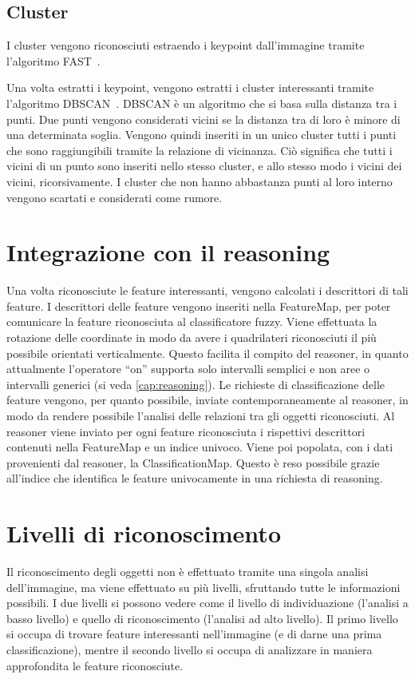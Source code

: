 \subsection{Cluster}

I cluster vengono riconosciuti estraendo i keypoint dall'immagine tramite l'algoritmo FAST~\cite{rosten_2006_machine}.


Una volta estratti i keypoint, vengono estratti i cluster interessanti tramite l'algoritmo DBSCAN~\cite{ester1996density}.
DBSCAN è un algoritmo che si basa sulla distanza tra i punti. Due punti vengono considerati vicini se la distanza tra di loro è minore di una determinata soglia. Vengono quindi inseriti in un unico cluster tutti i punti che sono raggiungibili tramite la relazione di vicinanza. Ciò significa che tutti i vicini di un punto sono inseriti nello stesso cluster, e allo stesso modo i vicini dei vicini, ricorsivamente.
I cluster che non hanno abbastanza punti al loro interno vengono scartati e considerati come rumore.

\section{Integrazione con il reasoning}
Una volta riconosciute le feature interessanti, vengono calcolati i descrittori di tali feature. I descrittori delle feature vengono inseriti nella FeatureMap, per poter comunicare la feature riconosciuta al classificatore fuzzy.
Viene effettuata la rotazione delle coordinate in modo da avere i quadrilateri riconosciuti il più possibile orientati verticalmente. Questo facilita il compito del reasoner, in quanto attualmente l'operatore ``on'' supporta solo intervalli semplici e non aree o intervalli generici (si veda \autoref{cap:reasoning}).
Le richieste di classificazione delle feature vengono, per quanto possibile, inviate contemporaneamente al reasoner, in modo da rendere possibile l'analisi delle relazioni tra gli oggetti riconosciuti. Al reasoner viene inviato per ogni feature riconosciuta i rispettivi descrittori contenuti nella FeatureMap e un indice univoco. Viene poi popolata, con i dati provenienti dal reasoner, la ClassificationMap. Questo è reso possibile grazie all'indice che identifica le feature univocamente in una richiesta di reasoning.


\section{Livelli di riconoscimento}
Il riconoscimento degli oggetti non è effettuato tramite una singola analisi dell'immagine, ma viene effettuato su più livelli, sfruttando tutte le informazioni possibili.
I due livelli si possono vedere come il livello di individuazione (l'analisi a basso livello) e quello di riconoscimento (l'analisi ad alto livello). Il primo livello si occupa di trovare feature interessanti nell'immagine (e di darne una prima classificazione), mentre il secondo livello si occupa di analizzare in maniera approfondita le feature riconosciute.

